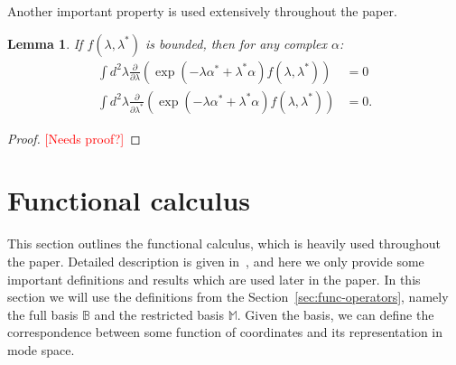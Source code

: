 \documentclass[12pt,aip,jmp,amssymb,amsmath]{revtex4-1}
\newcommand{\todo}[1]{\textcolor{red}{[#1]}}
\newcommand{\fullbasis}{\mathbb{B}}
\newcommand{\restbasis}{\mathbb{M}}
\newcommand{\secref}[1]{Section~\ref{sec:#1}}
\newtheorem{lemma}{Lemma}
\begin{document}
Another important property is used extensively throughout the paper.

\begin{lemma}
\label{lmm:c-numbers:zero-integrals}
    If $f(\lambda, \lambda^*)$ is bounded, then for any complex $\alpha$:
    \begin{equation*}\begin{split}
        \int d^2\lambda
            \frac{\partial}{\partial \lambda} \left(
                \exp(-\lambda \alpha^* + \lambda^* \alpha)
                f(\lambda, \lambda^*)
            \right)
        & = 0 \\
        \int d^2\lambda
            \frac{\partial}{\partial \lambda^*}
            \left(
                \exp(-\lambda \alpha^* + \lambda^* \alpha)
                f(\lambda, \lambda^*)
            \right)
        & = 0.
    \end{split}\end{equation*}
\end{lemma}
\begin{proof}
\todo{Needs proof?}
\end{proof}



\section{Functional calculus}

This section outlines the functional calculus, which is heavily used throughout the paper.
Detailed description is given in~\cite{Dalton2011}, and here we only provide some important definitions and results which are used later in the paper.
In this section we will use the definitions from the \secref{func-operators}, namely the full basis $\fullbasis$ and the restricted basis $\restbasis$.
Given the basis, we can define the correspondence between some function of coordinates and its representation in mode space.
\end{document}
